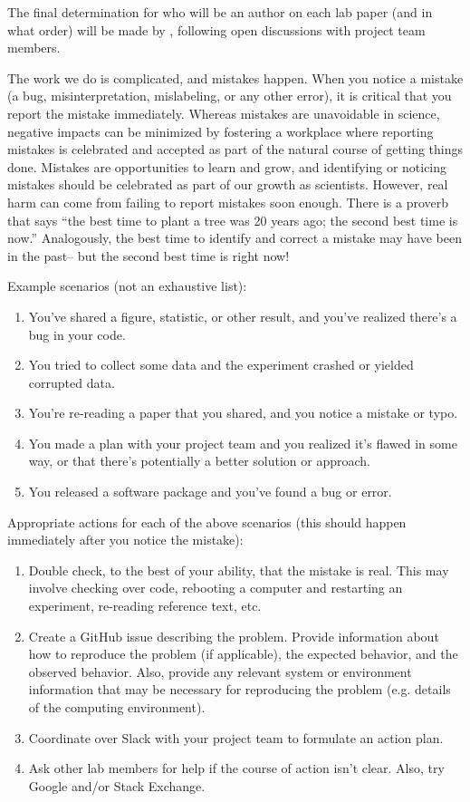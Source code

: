 \documentclass{tufte-book} %
\begin{document}
The final determination for who will be an author on each lab paper
(and in what order) will be made by \director, following open
discussions with project team members.


\noindent The work we do is complicated, and mistakes happen.  When
you notice a mistake (a bug, misinterpretation, mislabeling, or any
other error), it is critical that you report the mistake immediately.
Whereas mistakes are unavoidable in science, negative impacts can be
minimized by fostering a workplace where reporting mistakes is
celebrated and accepted as part of the natural course of getting
things done.  Mistakes are opportunities to learn and grow, and
identifying or noticing mistakes should be celebrated as part of our
growth as scientists.  However, real harm can come from failing to
report mistakes soon enough.  There is a proverb that says ``the best
time to plant a tree was 20 years ago; the second best time is now.''
Analogously, the best time to identify and correct a mistake may have
been in the past-- but the second best time is right now!

Example scenarios (not an exhaustive list):
\begin{enumerate}
  \item You've shared a figure, statistic, or other result, and
    you've realized there's a bug in your code.
  \item You tried to collect some data and the experiment crashed or
    yielded corrupted data.
  \item You're re-reading a paper that you shared, and you notice a
    mistake or typo.
  \item You made a plan with your project team and you realized it's
    flawed in some way, or that there's potentially a better solution
    or approach.
  \item You released a software package and you've found a bug or error.
\end{enumerate}

Appropriate actions for each of the above scenarios (this should
happen immediately after you notice the mistake):
\begin{enumerate}
\item Double check, to the best of your ability, that the mistake is
  real.  This may involve checking over code, rebooting a computer and
  restarting an experiment, re-reading reference text, etc.
\item Create a GitHub issue describing the problem.  Provide
  information about how to reproduce the problem (if applicable), the
  expected behavior, and the observed behavior.  Also, provide any
  relevant system or environment information that may be necessary for
  reproducing the problem (e.g. details of the computing environment).
\item Coordinate over Slack with your project team to formulate an
  action plan.
\item Ask other lab members for help if the course of action isn't
  clear.  Also, try Google and/or Stack Exchange.
\end{enumerate}
\end{document}
